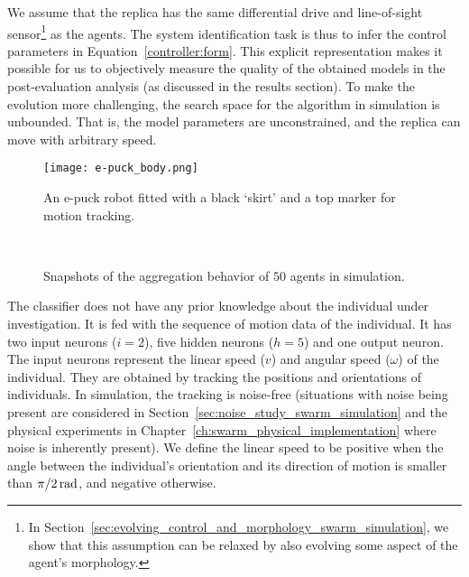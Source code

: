 We assume that the replica has the same differential drive and line-of-sight sensor\footnote{In Section~\ref{sec:evolving_control_and_morphology_swarm_simulation}, we show that this assumption can be relaxed by also evolving some aspect of the agent's morphology.} as the agents. The system identification task is thus to infer the control parameters in Equation~\eqref{controller:form}. This explicit representation makes it possible for us to objectively measure the quality of the obtained models in the post-evaluation analysis (as discussed in the results section). To make the evolution more challenging, the search space for the algorithm in simulation is unbounded. That is, the model parameters are unconstrained, and the replica can move with arbitrary speed. 
%
\begin{figure}[!t]
	\centering
	\texttt{[image: e-puck\_body.png]}  %
	\caption{An e-puck robot fitted with a black `skirt' and a top marker for motion tracking.}
	\label{fig:e-puck_body}
\end{figure}
%
\captionsetup[subfigure]{labelformat=empty}  
\begin{figure}[!t]
	\centering
	\\
	\caption{Snapshots of the aggregation behavior of $50$ agents in simulation. }
	\label{fig:aggregation_snapshoot}
\end{figure}

The classifier does not have any prior knowledge about the individual under investigation. It is fed with the sequence of motion data of the individual. It has two input neurons ($i=2$), five hidden neurons ($h=5$) and one output neuron. The input neurons represent the linear speed ($v$) and angular speed ($\omega$) of the individual. They are obtained by tracking the positions and orientations of individuals. In simulation, the tracking is noise-free (situations with noise being
present are considered in Section~\ref{sec:noise_study_swarm_simulation} and the physical experiments in Chapter~\ref{ch:swarm_physical_implementation} where noise is inherently present). We define the linear speed to be positive when the angle between the individual's orientation and its direction of motion is smaller than $\unit[\pi \small/ 2]{rad}$, and negative otherwise. %

